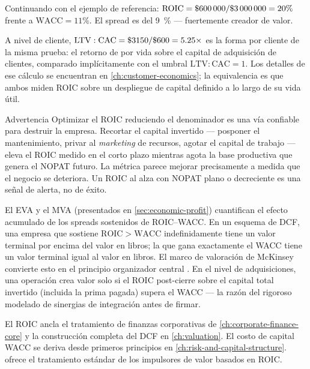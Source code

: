 \begin{example}
Continuando con el ejemplo de referencia: \(\mathrm{ROIC}=\$\num{600000}/\$\num{3000000}=20\%\)
frente a \(\mathrm{WACC}=11\%\). El spread es del \qty{9}{\percent} --- fuertemente
creador de valor.

A nivel de cliente, \(\mathrm{LTV}:\mathrm{CAC}=\$\num{3150}/\$\num{600}=5.25\times\)
es la forma por cliente de la misma prueba: el retorno de por vida sobre el capital de adquisición
de clientes, comparado implícitamente con el umbral \(\mathrm{LTV}:\mathrm{CAC}=1\). Los detalles
de ese cálculo se encuentran en \cref{ch:customer-economics}; la equivalencia es que ambos miden
ROIC sobre un despliegue de capital definido a lo largo de su vida útil.
\end{example}

\begin{admonition}{Advertencia}
Optimizar el ROIC reduciendo el denominador es una vía confiable para destruir la empresa.
Recortar el capital invertido --- posponer el mantenimiento, privar al \emph{marketing} de
recursos, agotar el capital de trabajo --- eleva el ROIC medido en el corto plazo mientras
agota la base productiva que genera el NOPAT futuro. La métrica parece mejorar precisamente
a medida que el negocio se deteriora. Un ROIC al alza con NOPAT plano o decreciente es una señal
de alerta, no de éxito.
\end{admonition}

El EVA y el MVA (presentados en \cref{sec:economic-profit}) cuantifican el efecto acumulado de
los spreads sostenidos de ROIC--WACC. En un esquema de DCF, una empresa que sostiene
\(\mathrm{ROIC}>\mathrm{WACC}\) indefinidamente tiene un valor terminal por encima del valor en
libros; la que gana exactamente el WACC tiene un valor terminal igual al valor en libros. El
marco de valoración de McKinsey convierte esto en el principio organizador central
\parencite{damodaran2012}. En el nivel de adquisiciones, una operación crea valor solo si el ROIC
post-cierre sobre el capital total invertido (incluida la prima pagada) supera el WACC --- la
razón del rigoroso modelado de sinergias de integración antes de firmar.

El ROIC ancla el tratamiento de finanzas corporativas de \cref{ch:corporate-finance-core} y la
construcción completa del DCF en \cref{ch:valuation}. El costo de capital WACC se deriva desde
primeros principios en \cref{ch:risk-and-capital-structure}. \textcite{damodaran2012} ofrece el
tratamiento estándar de los impulsores de valor basados en ROIC.

